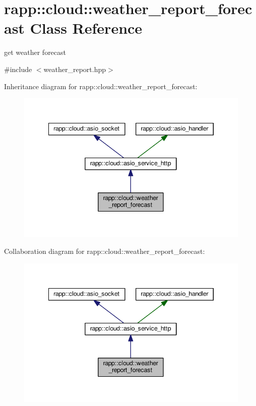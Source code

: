 \hypertarget{classrapp_1_1cloud_1_1weather__report__forecast}{\section{rapp\-:\-:cloud\-:\-:weather\-\_\-report\-\_\-forecast Class Reference}
\label{classrapp_1_1cloud_1_1weather__report__forecast}
}


get weather forecast  




{\ttfamily \#include $<$weather\-\_\-report.\-hpp$>$}



Inheritance diagram for rapp\-:\-:cloud\-:\-:weather\-\_\-report\-\_\-forecast\-:
\nopagebreak
\begin{figure}[H]
\begin{center}
\leavevmode
\includegraphics[width=345pt]{classrapp_1_1cloud_1_1weather__report__forecast__inherit__graph}
\end{center}
\end{figure}


Collaboration diagram for rapp\-:\-:cloud\-:\-:weather\-\_\-report\-\_\-forecast\-:
\nopagebreak
\begin{figure}[H]
\begin{center}
\leavevmode
\includegraphics[width=345pt]{classrapp_1_1cloud_1_1weather__report__forecast__coll__graph}
\end{center}
\end{figure}
